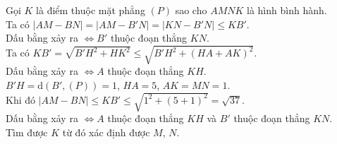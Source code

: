 \begin{ex}
{\begin{itemchoice}
\begin{center}
			\end{center}
			Gọi $K$ là điểm thuộc mặt phẳng $(P)$ sao cho $AMNK$ là hình bình hành.\\
			Ta có $|AM-BN|=|AM-B'N|=|KN-B'N|\le KB'$.\\
			Dấu bằng xảy ra $\Leftrightarrow B'$ thuộc đoạn thẳng $KN$.\\
			Ta có $KB'=\sqrt{B'H^2+HK^2} \le \sqrt{B'H^2+(HA+AK)^2}$.\\ Dấu bằng xảy ra $\Leftrightarrow A$ thuộc đoạn thẳng $KH$.\\
			$B'H=\mathrm{d}(B',(P))=1$,
			$HA=5$,
			$AK=MN=1$.\\
			Khi đó $|AM-BN|\le KB'\le \sqrt{1^2+(5+1)^2}=\sqrt{37}$.\\
			Dấu bằng xảy ra $\Leftrightarrow A$ thuộc đoạn thẳng $KH$ và $B'$ thuộc đoạn thẳng $KN$.\\ Tìm được $K$ từ đó xác định được $M$, $N$.
		\end{itemchoice}
	}
\end{ex}

